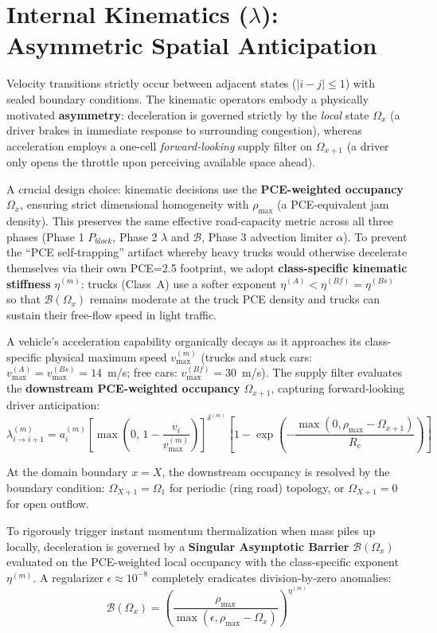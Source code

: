 \documentclass[11pt,a4paper]{article}
\begin{document}
\section{Internal Kinematics ($\lambda$): Asymmetric Spatial Anticipation}
Velocity transitions strictly occur between adjacent states ($|i-j|\le 1$) with sealed boundary conditions. The kinematic operators embody a physically motivated \textbf{asymmetry}: deceleration is governed strictly by the \emph{local} state $\Omega_x$ (a driver brakes in immediate response to surrounding congestion), whereas acceleration employs a one-cell \emph{forward-looking} supply filter on $\Omega_{x+1}$ (a driver only opens the throttle upon perceiving available space ahead).

A crucial design choice: kinematic decisions use the \textbf{PCE-weighted occupancy} $\Omega_x$, ensuring strict dimensional homogeneity with $\rho_{\max}$ (a PCE-equivalent jam density). This preserves the same effective road-capacity metric across all three phases (Phase 1 $P_{block}$, Phase 2 $\lambda$ and $\mathcal{B}$, Phase 3 advection limiter $\alpha$). To prevent the ``PCE self-trapping'' artifact whereby heavy trucks would otherwise decelerate themselves via their own PCE=2.5 footprint, we adopt \textbf{class-specific kinematic stiffness} $\eta^{(m)}$: trucks (Class~A) use a softer exponent $\eta^{(A)} < \eta^{(Bf)} = \eta^{(Bs)}$ so that $\mathcal{B}(\Omega_x)$ remains moderate at the truck PCE density and trucks can sustain their free-flow speed in light traffic.

A vehicle's acceleration capability organically decays as it approaches its class-specific physical maximum speed $v_{\max}^{(m)}$ (trucks and stuck cars: $v_{\max}^{(A)} = v_{\max}^{(Bs)} = 14$~m/s; free cars: $v_{\max}^{(Bf)} = 30$~m/s). The supply filter evaluates the \textbf{downstream PCE-weighted occupancy} $\Omega_{x+1}$, capturing forward-looking driver anticipation:
\begin{equation}
\lambda_{i\rightarrow i+1}^{(m)} = a_{i}^{(m)}\left[\max\!\left(0,\, 1-\frac{v_{i}}{v_{\max}^{(m)}}\right)\right]^{\delta^{(m)}} \left[1-\exp\left(-\frac{\max(0,\rho_{\max}-\Omega_{x+1})}{R_{c}}\right)\right]
\end{equation}

At the domain boundary $x = X$, the downstream occupancy is resolved by the boundary condition: $\Omega_{X+1} = \Omega_{1}$ for periodic (ring road) topology, or $\Omega_{X+1} = 0$ for open outflow.

To rigorously trigger instant momentum thermalization when mass piles up locally, deceleration is governed by a \textbf{Singular Asymptotic Barrier} $\mathcal{B}(\Omega_x)$ evaluated on the PCE-weighted local occupancy with the class-specific exponent $\eta^{(m)}$. A regularizer $\epsilon \approx 10^{-8}$ completely eradicates division-by-zero anomalies:
\begin{equation}
\mathcal{B}(\Omega_{x}) = \left(\frac{\rho_{\max}}{\max(\epsilon,\rho_{\max}-\Omega_{x})}\right)^{\eta^{(m)}}
\end{equation}
\end{document}

